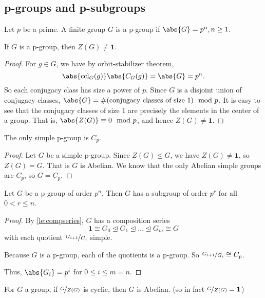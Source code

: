 \subsection{p-groups and p-subgroups}
\leavevmode
\begin{definition}{}{}
    Let \(p\) be a prime. A finite group \(G\) is a p-group if \(\abs{G} = p^n, n\geq 1\).
\end{definition}
\begin{theorem}{}{}
    If \(G\) is a p-group, then \(Z(G) \neq \textbf{1} \).
\end{theorem}
\begin{proof}
    For \(g \in G\), we have by orbit-stabilizer theorem,
    \[\abs{\mathrm{ccl}_G(g)} \abs{C_G(g)} = \abs{G} = p^n.\] 
    So each conjugacy class has size a power of \(p\). Since \(G\) is a disjoint union of conjugacy classes, \(\abs{G}= \# (\text{conjugacy classes of size 1})\mod p\). It is easy to see that the conjugacy classes of size 1 are precisely the elements in the center of a group. That is, \(\abs{Z(G)} \equiv 0 \mod p  \), and hence \(Z(G) \neq \textbf{1}\).
\end{proof}
\begin{corollary} The only simple p-group is \(C_p\).
\end{corollary}
\begin{proof}
    Let \(G\) be a simple p-group. Since \(Z(G) \trianglelefteq G\), we have \(Z(G) \neq \textbf{1} \), so \(Z(G) = G\). That is \(G\) is Abelian. We know that the only Abelian simple groups are \(C_p\), so \(G = C_p\).
\end{proof}
\begin{corollary}{}{}
    Let \(G\) be a p-group of order \(p^n\). Then \(G\) has a subgroup of order \(p^r\) for all \(0 < r \leq n\).
\end{corollary}
\begin{proof}
    By \cref{le:compseries}, \(G\) has a composition series
    \[
        \textbf{1} \cong G_0 \trianglelefteq G_1 \trianglelefteq \ldots \trianglelefteq G_m \cong G
    \]
    with each quotient \(\nicefrac{G_{i+1}}{G_{i}}\) simple.
    
    Because \(G\) is a p-group, each of the quotients is a p-group. So \(\nicefrac{G_{i+1}}{G_i}\cong C_p\).

    Thus, \(\abs{G_i} =p^i\) for \(0\leq i \leq m = n\).
\end{proof}
\begin{lemma}{}{}
    For \(G\) a group, if \(\nicefrac{G}{Z(G)}\) is cyclic, then \(G\) is Abelian. (so in fact \(\nicefrac{G}{Z(G)} = \textbf{1} \))
    \label{cyclicab}
\end{lemma}
